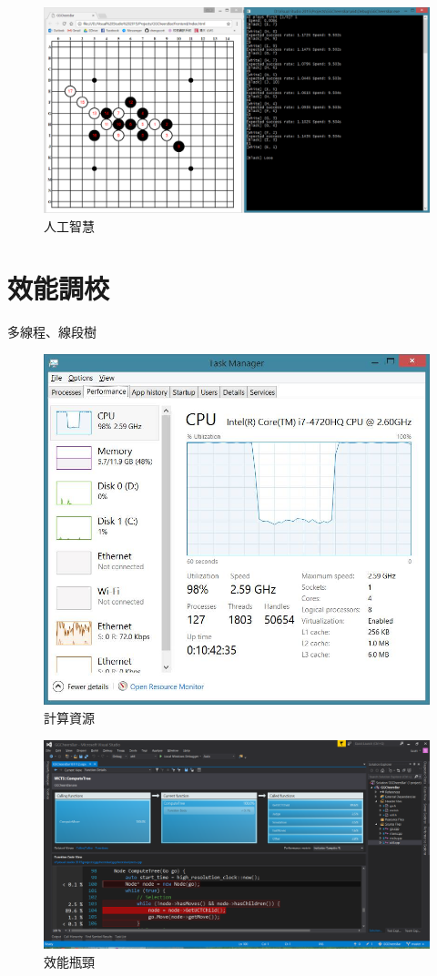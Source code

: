 \documentclass[12pt]{article}
\begin{document}
\begin{CJK}{UTF8}{bsmi}
\begin{figure}
  \caption{人工智慧}
  \centering
  \includegraphics[width=1\textwidth]{intelligent}
\end{figure}

\section{效能調校}
多線程、線段樹

\begin{figure}
  \caption{計算資源}
  \centering
  \includegraphics[width=1\textwidth]{cpu}
\end{figure}

\begin{figure}
  \caption{效能瓶頸}
  \centering
  \includegraphics[width=1\textwidth]{performance}
\end{figure}

\end{CJK}
\end{document}
